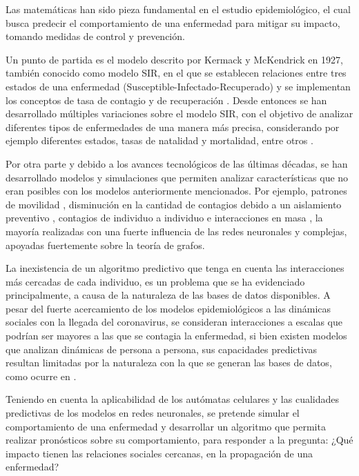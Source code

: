 Las matemáticas han sido pieza fundamental en el estudio epidemiológico, el cual busca predecir el comportamiento de una enfermedad para mitigar su impacto, tomando medidas de control y prevención. 

Un punto de partida es el modelo descrito por Kermack y McKendrick en 1927, también conocido como modelo SIR, en el que se establecen relaciones entre tres estados de una enfermedad (Susceptible-Infectado-Recuperado) y se implementan los conceptos de tasa de contagio y de recuperación \cite{malariaSIR}. Desde entonces se han desarrollado múltiples variaciones sobre el modelo SIR, con el objetivo de analizar diferentes tipos de enfermedades de una manera más precisa, considerando por ejemplo diferentes estados, tasas de natalidad y mortalidad, entre otros \cite{diego2010}.

Por otra parte y debido a los avances tecnológicos de las últimas décadas, se han desarrollado modelos y simulaciones que permiten analizar características que no eran posibles con los modelos anteriormente mencionados. Por ejemplo, patrones de movilidad \cite{colaGNN, epidemiologicalNeuralNetwork}, disminución en la cantidad de contagios debido a un aislamiento preventivo \cite{stayHome}, contagios de individuo a individuo \cite{heterogeneousPopulation} e interacciones en masa \cite{combiningGraph, transfer2021}, la mayoría realizadas con una fuerte influencia de las redes neuronales y complejas, apoyadas fuertemente sobre la teoría de grafos. 

La inexistencia de un algoritmo predictivo que tenga en cuenta las interacciones más cercadas de cada individuo, es un problema que se ha evidenciado principalmente, a causa de la naturaleza de las bases de datos disponibles. A pesar del fuerte acercamiento de los modelos epidemiológicos a las dinámicas sociales con la llegada del coronavirus, se consideran interacciones a escalas que podrían ser mayores a las que se contagia la enfermedad, si bien existen modelos que analizan dinámicas de persona a persona, sus capacidades predictivas resultan limitadas por la naturaleza con la que se generan las bases de datos, como ocurre en \cite{combiningGraph,transfer2021}.

Teniendo en cuenta la aplicabilidad de los autómatas celulares y las cualidades predictivas de los modelos en redes neuronales, se pretende simular el comportamiento de una enfermedad y desarrollar un algoritmo que permita realizar pronósticos sobre su comportamiento, para responder a la pregunta: ¿Qué impacto tienen las relaciones sociales cercanas, en la propagación de una enfermedad?